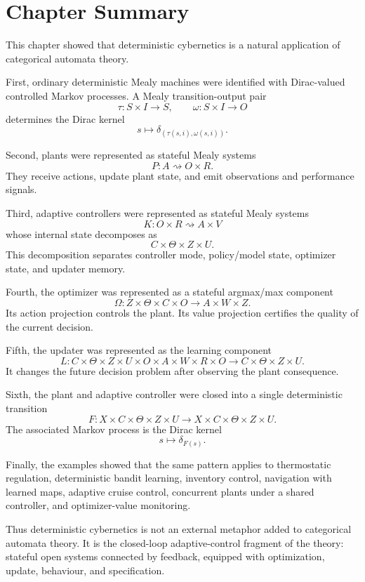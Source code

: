 \section{Chapter Summary}
\label{sec:cybernetic-summary}

This chapter showed that deterministic cybernetics is a natural application of categorical automata
theory.

First, ordinary deterministic Mealy machines were identified with Dirac-valued controlled Markov
processes.  A Mealy transition-output pair
\[
\tau:S\times I\to S,
\qquad
\omega:S\times I\to O
\]
determines the Dirac kernel
\[
s\longmapsto \delta_{(\tau(s,i),\omega(s,i))}.
\]

Second, plants were represented as stateful Mealy systems
\[
P:A\rightsquigarrow O\times R.
\]
They receive actions, update plant state, and emit observations and performance signals.

Third, adaptive controllers were represented as stateful Mealy systems
\[
K:O\times R\rightsquigarrow A\times V
\]
whose internal state decomposes as
\[
C\times\Theta\times Z\times U.
\]
This decomposition separates controller mode, policy/model state, optimizer state, and updater
memory.

Fourth, the optimizer was represented as a stateful argmax/max component
\[
\Omega:Z\times\Theta\times C\times O\to A\times W\times Z.
\]
Its action projection controls the plant.  Its value projection certifies the quality of the current
decision.

Fifth, the updater was represented as the learning component
\[
L:
C\times\Theta\times Z\times U
\times O\times A\times W\times R\times O
\to
C\times\Theta\times Z\times U.
\]
It changes the future decision problem after observing the plant consequence.

Sixth, the plant and adaptive controller were closed into a single deterministic transition
\[
F:X\times C\times\Theta\times Z\times U
\to
X\times C\times\Theta\times Z\times U.
\]
The associated Markov process is the Dirac kernel
\[
s\longmapsto \delta_{F(s)}.
\]

Finally, the examples showed that the same pattern applies to thermostatic regulation, deterministic
bandit learning, inventory control, navigation with learned maps, adaptive cruise control, concurrent
plants under a shared controller, and optimizer-value monitoring.

Thus deterministic cybernetics is not an external metaphor added to categorical automata theory.
It is the closed-loop adaptive-control fragment of the theory: stateful open systems connected by
feedback, equipped with optimization, update, behaviour, and specification.